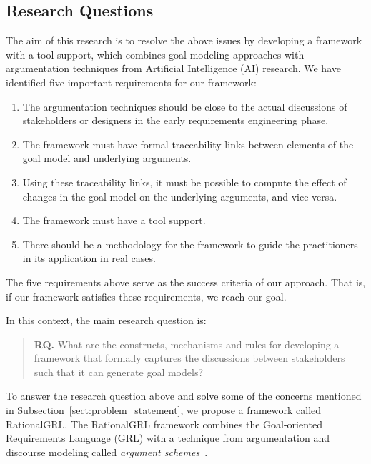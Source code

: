 \subsection{Research Questions}
 
The aim of this research is to resolve the above issues by developing a framework with a tool-support, which combines goal modeling approaches with argumentation techniques from Artificial Intelligence (AI) research\cite{atkinson2007}. We have identified five important requirements for our framework: 
\begin{enumerate}
\item The argumentation techniques should be close to the actual discussions of stakeholders or designers in the early requirements engineering phase.
\item 
The framework must have formal traceability links between elements of the goal model and underlying arguments.
\item 
Using these traceability links, it must be possible to compute the effect of changes in the goal model on the underlying arguments, and vice versa.
\item 
The framework must have a tool support.
\item 
There should be a methodology for the framework to guide the practitioners in its application in real cases.
\end{enumerate}

The five requirements above serve as the success criteria of our approach. That is, if our framework satisfies these requirements, we reach our goal. 

In this context, the main research question is: 

\begin{quote}
\textbf{RQ.} What are the constructs, mechanisms and rules for developing a framework that formally captures the discussions between stakeholders such that it can generate goal models?
\end{quote}


To answer the research question above and solve some of the concerns mentioned in Subsection~\ref{sect:problem_statement}, we propose a framework called RationalGRL. The RationalGRL framework combines the Goal-oriented Requirements Language (GRL) with a technique from argumentation and discourse modeling called \emph{argument schemes}~\cite{walton-etal2004}. 

